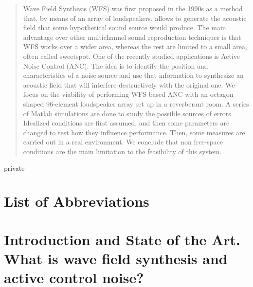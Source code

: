\documentclass[11pt,a4paper,notitlepage]{report}
\providecommand\phantomsection{}
\newcommand{\TexFolder}{Tex/}
\begin{document}
\begin{minipage}{14cm}
\begin{abstract}
\end{abstract}
\begin{abstract}
Wave Field Synthesis (WFS) was first proposed in the 1990s as a method that, by means of an array of loudspeakers, allows to generate the acoustic field that some hypothetical sound source would produce. The main advantage over other multichannel sound reproduction techniques is that WFS works over a wider area, whereas the rest are limited to a small area, often called sweetspot.  One of the recently studied applications is Active Noise Control (ANC). The idea is to identify the position and characteristics of a noise source and use that information to synthesize an acoustic field that will interfere destructively with the original one.
We focus on the viability of performing WFS based ANC with an octagon shaped 96-element loudspeaker array set up in a reverberant room. A series of Matlab simulations are done to study the possible sources of errors. Idealized conditions are first assumed, and then some parameters are changed to test how they influence performance. Then, some measures are carried out in a real environment. We conclude that non free-space conditions are the main limitation to the feasibility of this system.
\end{abstract}
\end{minipage}
\newpage

\phantomsection
\listoffigures

\newpage

\begin{shownto}{private}
\phantomsection
{}
\chapter*{List of Abbreviations}

\end{shownto}

\newpage
\setcounter{page}{1}

\chapter[Introduction and State of the Art]{Introduction and State of the Art.\\What is wave field synthesis and active control noise?}

\end{document}
